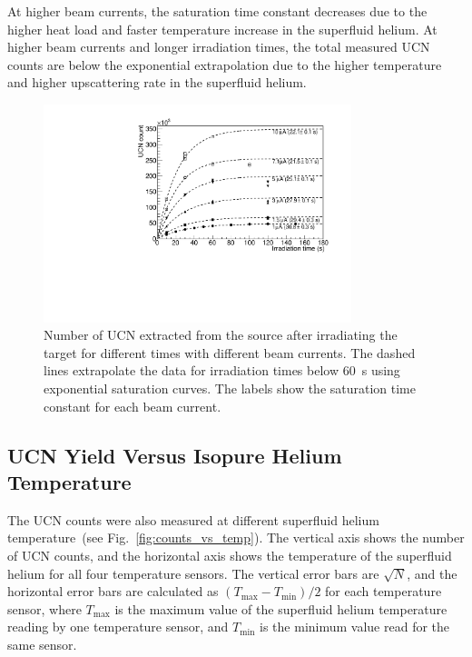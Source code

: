 At higher beam currents, the saturation time constant decreases due to
the higher heat load and faster temperature increase in the superfluid
helium. At higher beam currents and longer irradiation times, the
total measured UCN counts are below the exponential extrapolation due
to the higher temperature and higher upscattering rate in the
superfluid helium.

\begin{figure}[h!]
  \centering
  \includegraphics[width=0.8\textwidth]{UCNCounts_vs_irradTime.pdf}
  \caption[UCN yield versus target irradiation times]{Number of UCN
    extracted from the source after irradiating the target for
    different times with different beam currents. The dashed lines
    extrapolate the data for irradiation times below 60~s using
    exponential saturation curves. The labels show the saturation time
    constant for each beam current. }
  \label{fig:counts_vs_irrad}
\end{figure}


\subsection{UCN Yield Versus Isopure Helium Temperature}
The UCN counts were also measured at different superfluid helium
temperature~(see Fig.~\ref{fig:counts_vs_temp}). The vertical axis
shows the number of UCN counts, and the horizontal axis shows the
temperature of the superfluid helium for all four temperature
sensors. The vertical error bars are $\sqrt{N}$, and the horizontal
error bars are calculated as $(T_{\mathrm{max}}-T_{\mathrm{min}})/2$
for each temperature sensor, where $T_{\mathrm{max}}$ is the maximum
value of the superfluid helium temperature reading by one temperature
sensor, and $T_{\mathrm{min}}$ is the minimum value read for the same
sensor.

